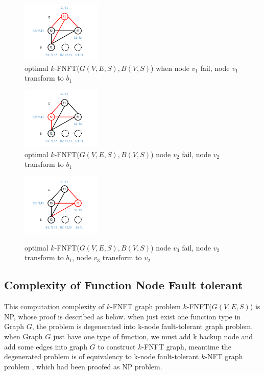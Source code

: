 \begin{figure}[tp]
\centering
\begin{minipage}[t]{0.3\linewidth}
\centering
\includegraphics[width=1.5in]{Fig/SNFToptimal_n1Fail}\\
\caption{optimal $k$-FNFT($G(V,E,S),B(V,S)$) when node $v_1$ fail, node $v_1$ transform to $b_1$}\label{fig:SNFToptimal_n1Fail}
\end{minipage}
\hfill
\begin{minipage}[t]{0.3\linewidth}
\centering
\includegraphics[width=1.5in]{Fig/SNFToptimal_n2Fail}\\
\caption{optimal $k$-FNFT($G(V,E,S),B(V,S)$) node $v_2$ fail, node $v_2$ transform to $b_1$}\label{fig:SNFToptimal_n2Fail}
\end{minipage}
\hfill
\begin{minipage}[t]{0.3\linewidth}
\centering
\includegraphics[width=1.5in]{Fig/SNFToptimal_n3Fail}\\
\caption{optimal $k$-FNFT($G(V,E,S),B(V,S)$) node $v_3$ fail, node $v_2$ transform to $b_1$, node $v_3$ transform to $v_2$}\label{fig:SNFToptimal_n3Fail}
\end{minipage}
\end{figure}

\subsection{Complexity of Function Node Fault tolerant}
\label{sec:Complexity}
This computation complexity of $k$-FNFT graph problem $k$-FNFT($G(V,E,S)$) is NP, whose proof is described as below. when just exist one function type in Graph $G$, the problem is degenerated into k-node fault-tolerant graph problem. when Graph $G$ just have one type of function, we must add k backup node and add some edges into graph $G$ to construct $k$-FNFT graph, meantime the degenerated problem is of equivalency to k-node fault-tolerant $k$-NFT graph problem , which had been proofed as NP problem\cite{harary1996node}.

